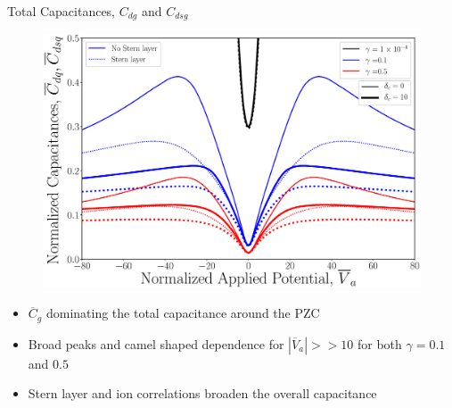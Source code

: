 \documentclass{beamer}
\begin{document}
\begin{frame}{Total Capacitances, $C_{dg}$ and $C_{dsg}$}
   \begin{figure}[!h]
    \begin{center}
    \includegraphics[scale=0.15]{figure_6.eps}
    \end{center}
\end{figure}
\begin{itemize}
    \item $\overline{C}_g$ dominating the total capacitance around the PZC
    \item Broad peaks and camel shaped dependence for $|\overline{V}_a| >> 10$ for both $\gamma = 0.1$ and $0.5$
    \item Stern layer and ion correlations broaden the overall capacitance
\end{itemize}{} 
\end{frame}{}
\end{document}
